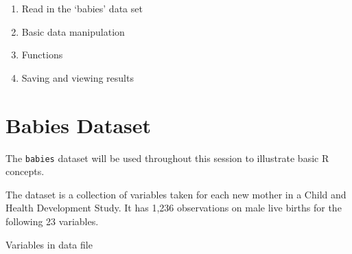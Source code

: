\documentclass[
]{book}
\providecommand{\tightlist}{%
  \setlength{\itemsep}{0pt}\setlength{\parskip}{0pt}}
\begin{document}
\begin{enumerate}
\def\labelenumi{\arabic{enumi}.}
\tightlist
\item
  Read in the `babies' data set
\item
  Basic data manipulation
\item
  Functions
\item
  Saving and viewing results
\end{enumerate}

\hypertarget{babies-dataset}{%
\section*{Babies Dataset}\label{babies-dataset}}

The \texttt{babies} dataset will be used throughout this session to illustrate basic R concepts.

The dataset is a collection of variables taken for each new mother in a Child and Health Development Study. It has 1,236 observations on male live births for the following 23 variables.

Variables in data file
\end{document}
